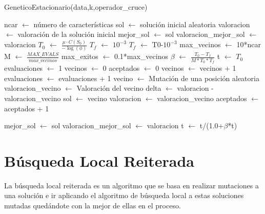 \documentclass[12pt,a4paper]{article}
\begin{document}
	\begin{algorithm}
		\caption{GeneticoEstacionario(data,k,operador\_cruce)}
		\begin{algorithmic}
			\STATE ncar $\leftarrow$ número de características
			\STATE sol  $\leftarrow$ solución inicial aleatoria
			\STATE valoracion $\leftarrow$ valoración de la solución inicial
			\STATE mejor\_sol $\leftarrow$ sol
			\STATE valoracion\_mejor\_sol $\leftarrow$ valoracion
			\STATE
			\STATE $T_0$ $\leftarrow$ $\frac{\mu  \cdot C(S_0)}{-\log(\phi)}$
			\STATE
				\STATE $T_f$ $\leftarrow$ $10^{-3}$
			\ELSE
				\STATE $T_f$  $\leftarrow$ T0-$10^{-3}$
			\ENDIF
			\STATE max\_vecinos $\leftarrow$ 10*ncar
			\STATE M $\leftarrow$ $\frac{MAX\_EVALS}{max\_vecinos}$
			\STATE max\_exitos $\leftarrow$ 0.1*max\_vecinos
			\STATE
			\STATE $\beta$ $\leftarrow$ $\frac{T_0-T_f}{M*T_0*T_f}$
			\STATE
			\STATE t $\leftarrow$ $T_0$
			\STATE evaluaciones $\leftarrow$ 1
				\STATE vecinos $\leftarrow$ 0
				\STATE aceptados $\leftarrow$ 0
					\STATE vecinos $\leftarrow$ vecinos + 1
					\STATE evaluaciones $\leftarrow$ evaluaciones + 1
					\STATE vecino $\leftarrow$ Mutación de una posición aleatoria
					\STATE valoracion\_vecino $\leftarrow$ Valoración del vecino
					\STATE delta $\leftarrow$ valoracion - valoracion\_vecino
						\STATE sol $\leftarrow$ vecino
						\STATE valoracion $\leftarrow$ valoracion\_vecino
						\STATE aceptados $\leftarrow$ aceptados + 1
						
							\STATE mejor\_sol $\leftarrow$ sol
							\STATE valoracion\_mejor\_sol $\leftarrow$ valoracion
						\ENDIF
					\ENDIF
				\ENDWHILE
				\STATE t $\leftarrow$ t/(1.0+$\beta$*t)
			\ENDWHILE
		\end{algorithmic}
	\end{algorithm}
	
	\newpage
	
	\section{Búsqueda Local Reiterada}
	\label{sec:ILS}
	
	La búsqueda local reiterada es un algoritmo que se basa en realizar mutaciones a una solución e ir aplicando el algoritmo de búsqueda local a estas soluciones mutadas quedándote con la mejor de ellas en el proceso.
	
\end{document}
